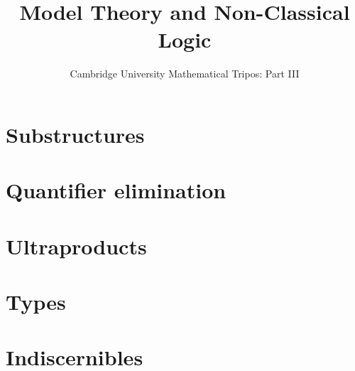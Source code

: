 \documentclass{article}
\title{Model Theory and Non-Classical Logic}
\author{Cambridge University Mathematical Tripos: Part III}
\begin{document}
\maketitle

\tableofcontentsnewpage{}

\section{Substructures}

\section{Quantifier elimination}

\section{Ultraproducts}

\section{Types}

\section{Indiscernibles}

\end{document}
